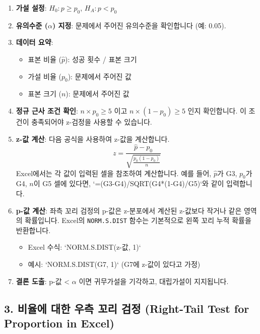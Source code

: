 \documentclass[11pt,a4paper]{article}
\begin{document}
\begin{enumerate}
    \item \textbf{가설 설정}: $H_0: p \ge p_0$, $H_A: p < p_0$
    \item \textbf{유의수준 ($\alpha$) 지정}: 문제에서 주어진 유의수준을 확인합니다 (예: 0.05).
    \item \textbf{데이터 요약}:
    \begin{itemize}
        \item 표본 비율 ($\hat{p}$): 성공 횟수 / 표본 크기
        \item 가설 비율 ($p_0$): 문제에서 주어진 값
        \item 표본 크기 ($n$): 문제에서 주어진 값
    \end{itemize}
    \item \textbf{정규 근사 조건 확인}: $n \times p_0 \ge 5$ 이고 $n \times (1 - p_0) \ge 5$ 인지 확인합니다. 이 조건이 충족되어야 z-검정을 사용할 수 있습니다.
    \item \textbf{z-값 계산}: 다음 공식을 사용하여 z-값을 계산합니다.
    $$z = \frac{\hat{p} - p_0}{\sqrt{\frac{p_0(1-p_0)}{n}}}$$
    Excel에서는 각 값이 입력된 셀을 참조하여 계산합니다. 예를 들어, $\hat{p}$가 G3, $p_0$가 G4, $n$이 G5 셀에 있다면, `=(G3-G4)/SQRT(G4*(1-G4)/G5)`와 같이 입력합니다.
    \item \textbf{p-값 계산}: 좌측 꼬리 검정의 p-값은 z-분포에서 계산된 z-값보다 작거나 같은 영역의 확률입니다. Excel의 \texttt{NORM.S.DIST} 함수는 기본적으로 왼쪽 꼬리 누적 확률을 반환합니다.
    \begin{itemize}
        \item Excel 수식: `NORM.S.DIST(z-값, 1)`
        \item 예시: `NORM.S.DIST(G7, 1)` (G7에 z-값이 있다고 가정)
    \end{itemize}
    \item \textbf{결론 도출}: p-값 < $\alpha$ 이면 귀무가설을 기각하고, 대립가설이 지지됩니다.
\end{enumerate}

\subsection*{3. 비율에 대한 우측 꼬리 검정 (Right-Tail Test for Proportion in Excel)}
\end{document}
